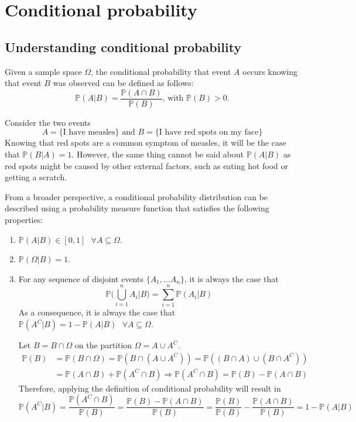 \documentclass{report}
\begin{document}
\chapter{Conditional probability}
\section{Understanding conditional probability}
Given a sample space $\displaystyle \Omega$, the conditional probability that event $\displaystyle A$ occurs knowing that event $\displaystyle B$ was observed can be defined as follows:
\[\mathbb{P}(A|B) = \frac{\mathbb{P}(A \cap B)}{\mathbb{P}(B)} \text{, with $\mathbb{P}(B) > 0$.}\]
\begin{examplebox}
    Consider the two events
    \[A = \{\text{I have measles}\} \text{ and } B = \{\text{I have red spots on my face}\}\]
    Knowing that red spots are a common symptom of measles, it will be the case that $\displaystyle \mathbb{P}(B|A) = 1$. \newline
    However, the same thing cannot be said about $\displaystyle \mathbb{P}(A|B)$ as red spots might be caused by other external factors, such as eating hot food or getting a scratch.
\end{examplebox}
\noindent From a broader perspective, a conditional probability distribution can be described using a probability measure function that satisfies the following properties:
\begin{enumerate}
    \item $\displaystyle \mathbb{P}(A|B) \in [0, 1] \text{ } \forall A \subseteq \Omega$.
    \item $\displaystyle \mathbb{P}(\Omega|B) = 1$.
    \item For any sequence of disjoint events $\displaystyle \{A_1, \dots A_n\}$, it is always the case that
    \[\mathbb{P}\Bigg(\bigcup_{i = 1}^n A_i\Bigg|B\Bigg) = \sum_{i = 1}^n \mathbb{P}(A_i|B)\]
    As a consequence, it is always the case that $\displaystyle \mathbb{P}(A^C|B) = 1 - \mathbb{P}(A|B) \text{ } \forall A \subseteq \Omega$.
    \begin{proofbox}
        Let $\displaystyle B = B \cap \Omega$ on the partition $\displaystyle \Omega = A \cup A^C$.
        \begin{align*}
            \mathbb{P}(B)
                &= \mathbb{P}(B \cap \Omega) = \mathbb{P}(B \cap (A \cup A^C)) = \mathbb{P}((B \cap A) \cup (B \cap A^C)) \\
                &= \mathbb{P}(A \cap B) + \mathbb{P}(A^C \cap B) \Rightarrow \mathbb{P}(A^C \cap B) = \mathbb{P}(B) - \mathbb{P}(A \cap B)
        \end{align*}
        Therefore, applying the definition of conditional probability will result in
        \[\mathbb{P}(A^C|B) = \frac{\mathbb{P}(A^C \cap B)}{\mathbb{P}(B)} = \frac{\mathbb{P}(B) - \mathbb{P}(A \cap B)}{\mathbb{P}(B)} = \frac{\mathbb{P}(B)}{\mathbb{P}(B)} - \frac{\mathbb{P}(A \cap B)}{\mathbb{P}(B)} = 1 - \mathbb{P}(A|B)\]
    \end{proofbox}
\end{enumerate}
\end{document}
